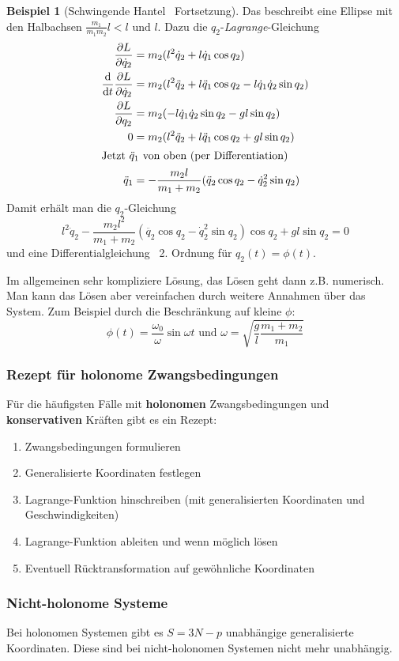 \documentclass[oneside]{book}
\theoremstyle{definition}
\newtheorem*{beispiel*}{Beispiel}
\newcommand{\Dgl}{Differentialgleichung}
\renewcommand{\d}{\mathrm d}
\newcommand{\dd}[1]{\frac{\d}{\d #1}}
\newcommand{\ffpartial}[2]{\frac{\partial #1}{\partial #2}}
\begin{document}
\begin{beispiel*}[Schwingende Hantel \textendash~Fortsetzung]
	Das beschreibt eine Ellipse mit den Halbachsen $\frac{m_1}{m_1 m_2}l < l \text{~und~} l$.
	Dazu die $q_2$-\textit{Lagrange}-Gleichung
	\begin{align*}
	\ffpartial{L}{\dot{q}_2} &= m_2 (l^2 \dot{q}_2 + l \dot{q}_1 \cos q_2)\\
	\dd t \ffpartial{L}{\dot{q}_2} &= m_2 (l^2 \ddot{q}_2 + l \ddot{q}_1 \cos q_2 - l \dot{q}_1 \dot{q}_2 \sin q_2)\\
	\ffpartial{L}{q_2} &= m_2 (- l \dot{q}_1 \dot{q}_2 \sin q_2 - g l \sin q_2)\\
	0 &= m_2 (l^2 \ddot{q}_2 + l \ddot{q}_1 \cos q_2 + g l \sin q_2)\\
	\intertext{Jetzt $\ddot{q}_1$ von oben (per Differentiation)}
	\ddot{q}_1 &= - \frac{m_2 l}{m_1 + m_2} (\ddot{q}_2 \cos q_2 - \dot{q}_2^2 \sin q_2)
	\end{align*}
	Damit erhält man die $q_2$-Gleichung
	$$l^2 \ddot{q}_2 - \frac{m_2 l^2}{m_1 + m_2}(\ddot{q_2} \cos q_2 - \dot{q}_2^2 \sin q_2) \cos q_2 + g l \sin q_2 = 0$$
	und eine \Dgl~ 2. Ordnung für $q_2(t) = \phi(t)$.
	
	Im allgemeinen sehr kompliziere Lösung, das Lösen geht dann z.B. numerisch. Man kann das Lösen aber vereinfachen durch weitere Annahmen über das System. Zum Beispiel durch die Beschränkung auf kleine $\phi$:
	$$\phi(t) = \frac{\omega_0}{\omega} \sin \omega t \text{~und~} \omega = \sqrt{\frac{g}{l} \frac{m_1 + m_2}{m_1}}$$
\end{beispiel*}


\subsubsection{Rezept für holonome Zwangsbedingungen}

Für die häufigsten Fälle mit \textbf{holonomen} Zwangsbedingungen und \textbf{konservativen} Kräften gibt es ein Rezept:
\begin{enumerate}
\item Zwangsbedingungen formulieren
\item Generalisierte Koordinaten festlegen
\item Lagrange-Funktion hinschreiben (mit generalisierten Koordinaten und Geschwindigkeiten)
\item Lagrange-Funktion ableiten und wenn möglich lösen
\item Eventuell Rücktransformation auf gewöhnliche Koordinaten
\end{enumerate}

\subsubsection{Nicht-holonome Systeme}
Bei holonomen Systemen gibt es $S = 3N - p$ unabhängige generalisierte Koordinaten. Diese sind bei nicht-holonomen Systemen nicht mehr unabhängig.
\end{document}
